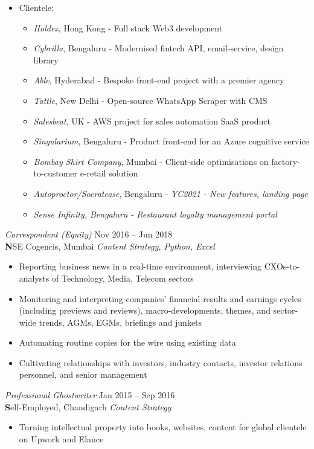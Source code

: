 \documentclass[margin, 10pt]{res} %
\begin{document}
\begin{resume}
\begin{itemize}
\item Clientele:
\begin{itemize}
\item {\sl Holdex}, Hong Kong - Full stack Web3 development
\item {\sl Cybrilla}, Bengaluru - Modernised fintech API, email-service, design library
\item {\sl Able}, Hyderabad - Bespoke front-end project with a premier agency
\item {\sl Tattle}, New Delhi - Open-source WhatsApp Scraper with CMS
\item {\sl Salesbeat}, UK - AWS project for sales automation SaaS product
\item {\sl Singularium}, Bengaluru - Product front-end for an Azure cognitive service
\item {\sl Bombay Shirt Company}, Mumbai - Client-side optimisations on factory-to-customer e-retail solution
\item {\sl Autoproctor/Socratease}, Bengaluru - \sl YC2021 - New features, landing page
\item {\sl Sense Infinity, Bengaluru - Restaurant loyalty management portal}

\end{itemize}


\end{itemize}

{\sl Correspondent (Equity)} \hfill Nov 2016 – Jun 2018 \\
\textbf NSE Cogencis, Mumbai \hfill {\scriptsize \it Content Strategy, Python, Excel}
\begin{itemize}\smallskip\smallskip
\item Reporting business news in a real-time environment, interviewing CXOs-to-analysts of Technology, Media, Telecom sectors
\item Monitoring and interpreting companies’ financial results and earnings cycles (including previews and reviews), macro-developments, themes, and sector-wide trends, AGMs, EGMs, briefings and junkets
\item Automating routine copies for the wire using existing data
\item Cultivating relationships with investors, industry contacts, investor relations personnel, and senior management

\end{itemize}

{\sl Professional Ghostwriter} \hfill Jan 2015 – Sep 2016 \\
\textbf Self-Employed, Chandigarh \hfill {\scriptsize \it Content Strategy}
\begin{itemize}\smallskip\smallskip
\item Turning intellectual property into books, websites, content for global clientele on Upwork and Elance
\end{itemize}


\end{resume}
\end{document}
